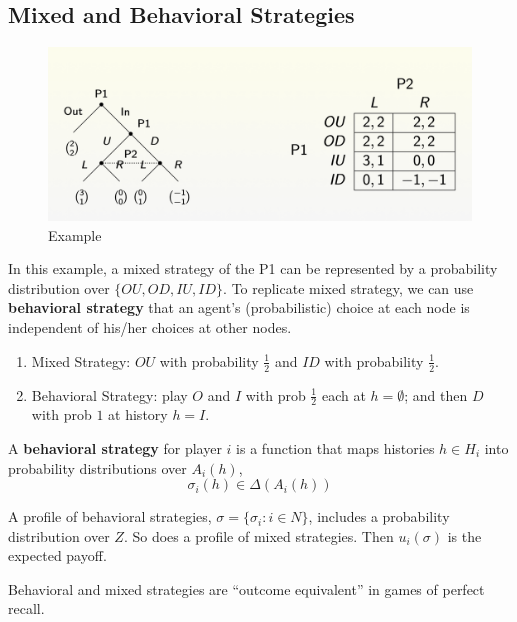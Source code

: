 \documentclass[11pt]{elegantbook}
\begin{document}
\subsection{Mixed and Behavioral Strategies}
\begin{figure}[htbp]
    \centering
    \includegraphics[scale=0.2]{BS.png}
    \caption{Example}
    \label{}
\end{figure}
In this example, a mixed strategy of the P1 can be represented by a probability distribution over $\{OU,OD,IU,ID\}$. To replicate mixed strategy, we can use \textbf{behavioral strategy} that an agent's (probabilistic) choice at each node is independent of his/her choices at other nodes.
\begin{example}
    \begin{enumerate}
        \item Mixed Strategy: $OU$ with probability $\frac{1}{2}$ and $ID$ with probability $\frac{1}{2}$.
        \item Behavioral Strategy: play $O$ and $I$ with prob $\frac{1}{2}$ each at $h = \emptyset$;
        and then $D$ with prob $1$ at history $h = I$.
    \end{enumerate}
\end{example}

\begin{definition}
    \normalfont
    A \textbf{behavioral strategy} for player $i$ is a function that maps histories $h \in H_i$ into probability distributions over $A_i(h)$,
    $$\sigma_i(h)\in\Delta(A_i(h))$$
\end{definition}

A profile of behavioral strategies, $\sigma=\{\sigma_i:i\in N\}$, includes a probability distribution over $Z$. So does a profile of mixed strategies. Then $u_i(\sigma)$ is the expected payoff.

\begin{theorem}
    Behavioral and mixed strategies are ``outcome equivalent'' in games of perfect recall.
\end{theorem}
\end{document}
